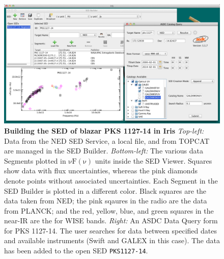 \documentclass[final,5p]{elsarticle}
\begin{document}
\begin{figure}
\centering
\includegraphics[height=0.3\textheight]{figures/built-in-visuals-loading1.png}
\caption{\textbf{Building the SED of blazar PKS 1127-14 in Iris} \textit{Top-left:} Data from the NED SED Service, a local file, and from TOPCAT are managed in the SED Builder. \textit{Bottom-left:} The various data Segments plotted in $\mathrm{\nu F \left( \nu \right)}$ units inside the SED Viewer. Squares show data with flux uncertainties, whereas the pink diamonds denote points without associated uncertainties. Each Segment in the SED Builder is plotted in a different color. Black squares are the data taken from NED; the pink sqaures in the radio are the data from PLANCK; and the red, yellow, blue, and green squares in the near-IR are the for WISE bands. \textit{Right:} An ASDC Data Query form for PKS 1127-14. The user searches for data between specified dates and available instruments (Swift and GALEX in this case). The data has been added to the open SED \texttt{PKS1127-14}.}
\label{fig:load_data}
\end{figure}
\end{document}
